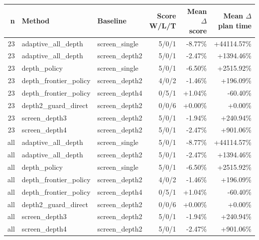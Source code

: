 \begin{tabular}{rllrrr}
\toprule
n & Method & Baseline & Score W/L/T & Mean $\Delta$ score & Mean $\Delta$ plan time \\
\midrule
23 & adaptive_all_depth & screen_single & 5/0/1 & -8.77\% & +44114.57\% \\
23 & adaptive_all_depth & screen_depth2 & 5/0/1 & -2.47\% & +1394.46\% \\
23 & depth_policy & screen_single & 5/0/1 & -6.50\% & +2515.92\% \\
23 & depth_frontier_policy & screen_depth2 & 4/0/2 & -1.46\% & +196.09\% \\
23 & depth_frontier_policy & screen_depth4 & 0/5/1 & +1.04\% & -60.40\% \\
23 & depth2_guard_direct & screen_depth2 & 0/0/6 & +0.00\% & +0.00\% \\
23 & screen_depth3 & screen_depth2 & 5/0/1 & -1.94\% & +240.94\% \\
23 & screen_depth4 & screen_depth2 & 5/0/1 & -2.47\% & +901.06\% \\
all & adaptive_all_depth & screen_single & 5/0/1 & -8.77\% & +44114.57\% \\
all & adaptive_all_depth & screen_depth2 & 5/0/1 & -2.47\% & +1394.46\% \\
all & depth_policy & screen_single & 5/0/1 & -6.50\% & +2515.92\% \\
all & depth_frontier_policy & screen_depth2 & 4/0/2 & -1.46\% & +196.09\% \\
all & depth_frontier_policy & screen_depth4 & 0/5/1 & +1.04\% & -60.40\% \\
all & depth2_guard_direct & screen_depth2 & 0/0/6 & +0.00\% & +0.00\% \\
all & screen_depth3 & screen_depth2 & 5/0/1 & -1.94\% & +240.94\% \\
all & screen_depth4 & screen_depth2 & 5/0/1 & -2.47\% & +901.06\% \\
\bottomrule
\end{tabular}
